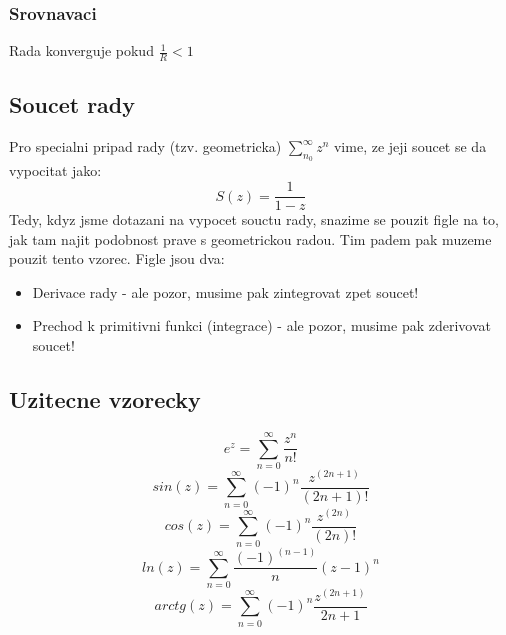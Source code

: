 \subsubsection*{Srovnavaci}
Rada konverguje pokud $\frac{1}{R} < 1$

\subsection*{Soucet rady}
Pro specialni pripad rady (tzv. geometricka) $\sum_{n_0}^\infty z^n$ vime, ze jeji soucet se da vypocitat jako:
\begin{equation}
\label{eq:soucetr}
S(z) = \frac{1}{1-z}
\end{equation}
Tedy, kdyz jsme dotazani na vypocet souctu rady, snazime se pouzit figle na to, jak tam najit podobnost prave s geometrickou radou. Tim padem pak muzeme pouzit tento vzorec. Figle jsou dva:
\begin{itemize}
\item Derivace rady - ale pozor, musime pak zintegrovat zpet soucet!
\item Prechod k primitivni funkci (integrace) - ale pozor, musime pak zderivovat soucet!
\end{itemize}

\subsection*{\label{sec:rozviteFce} Uzitecne vzorecky}
$$e^z = \sum_{n=0}^\infty \frac{z^n}{n!}$$
$$sin(z) = \sum_{n=0}^\infty (-1)^n \frac{z^{(2n+1)}}{(2n+1)!}$$
$$cos(z) = \sum_{n=0}^\infty (-1)^n \frac{z^{(2n)}}{(2n)!} $$
$$ln(z) = \sum_{n=0}^\infty \frac{(-1)^{(n-1)}}{n}(z-1)^n$$
$$arctg(z) = \sum_{n=0}^\infty (-1)^n \frac{z^{(2n+1)}}{2n+1}$$


